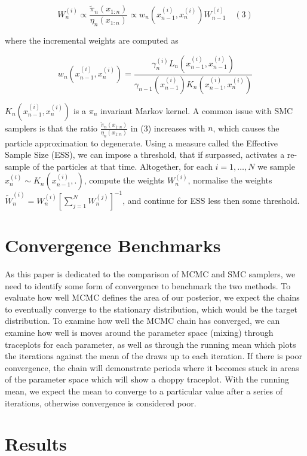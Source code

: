 \documentclass[12pt]{elsarticle}
\begin{document}
\[
W_n^{(i)} \propto \frac{\tilde{\pi}_n(x_{1:n})}{\eta_n(x_{1:n})} \propto w_n(x_{n-1}^{(i)}, x_n^{(i)})W_{n-1}^{(i)} \quad (3)
\]

where the incremental weights are computed as

\[
w_n(x_{n-1}^{(i)}, x_n^{(i)}) = \frac{\gamma_n^{(i)}L_{n}(x_{n-1}^{(i)}, x_{n-1}^{(i)})}{\gamma_{n-1}(x_{n-1}^{(i)}) K_n(x_{n-1}^{(i)}, x_n^{(i)})}
\]

$K_n(x_{n-1}^{(i)}, x_n^{(i)})$ is a $\pi_n$ invariant Markov kernel. A common issue with SMC samplers is that the ratio $\frac{\tilde{\pi}_n(x_{1:n})}{\eta_n(x_{1:n})}$ in (3) increases with $n$, which causes the particle approximation to degenerate. Using a measure called the Effective Sample Size (ESS), we can impose a threshold, that if surpassed, activates a re-sample of the particles at that time. Altogether, for each $i = 1, \dots, N$ we sample $x_n^{(i)} \sim K_n(x_{n-1}^{(i)}, .)$, compute the weights $W_n^{(i)}$, normalise the weights $\tilde{W}_n^{(i)} = W_n^{(i)}[\sum_{j=1}^N W_n^{(j)}]^{-1}$, and continue for ESS less then some threshold.

\section*{Convergence Benchmarks}
As this paper is dedicated to the comparison of MCMC and SMC samplers, we need to identify some form of convergence to benchmark the two methods. To evaluate how well MCMC defines the area of our posterior, we expect the chains to eventually converge to the stationary distribution, which would be the target distribution. To examine how well the MCMC chain has converged, we can examine how well is moves around the parameter space (mixing) through traceplots for each parameter, as well as through the running mean which plots the iterations against the mean of the draws up to each iteration. If there is poor convergence, the chain will demonstrate periods where it becomes stuck in areas of the parameter space which will show a choppy traceplot. With the running mean, we expect the mean to converge to a particular value after a series of iterations, otherwise convergence is considered poor.


\section*{Results}
\end{document}
